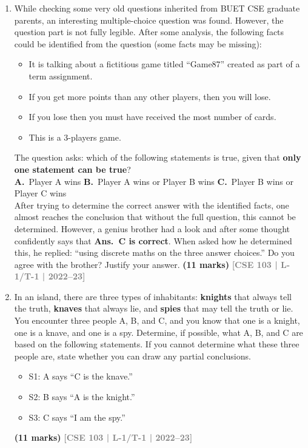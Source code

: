 \documentclass[12pt,a3paper]{article}
\newcommand{\yr}[1]{\hfill\textcolor{gray}{\small\textbf{[#1]}}}
\newcommand{\mk}[1]{\textcolor{orange!70!black}{\small\textbf{(#1 marks)}}}
\begin{document}
\begin{enumerate}
\item While checking some very old questions inherited from BUET CSE graduate parents, an interesting multiple-choice question was found. However, the question part is not fully legible. After some analysis, the following facts could be identified from the question (some facts may be missing):
\begin{itemize}[leftmargin=1.8em,itemsep=2pt,label={$\bullet$}]
  \item It is talking about a fictitious game titled ``Game87'' created as part of a term assignment.
  \item If you get more points than any other players, then you will lose.
  \item If you lose then you must have received the most number of cards.
  \item This is a 3-players game.
\end{itemize}
The question asks: which of the following statements is true, given that \textbf{only one statement can be true}?\\[4pt]
\textbf{A.}\ Player A wins \quad \textbf{B.}\ Player A wins or Player B wins \quad \textbf{C.}\ Player B wins or Player C wins\\[6pt]
After trying to determine the correct answer with the identified facts, one almost reaches the conclusion that without the full question, this cannot be determined. However, a genius brother had a look and after some thought confidently says that \textbf{Ans.\ C is correct}. When asked how he determined this, he replied: ``using discrete maths on the three answer choices.'' Do you agree with the brother? Justify your answer.
\mk{11} \yr{CSE 103 | L-1/T-1 | 2022--23}

\item In an island, there are three types of inhabitants: \textbf{knights} that always tell the truth, \textbf{knaves} that always lie, and \textbf{spies} that may tell the truth or lie. You encounter three people A, B, and C, and you know that one is a knight, one is a knave, and one is a spy. Determine, if possible, what A, B, and C are based on the following statements. If you cannot determine what these three people are, state whether you can draw any partial conclusions.
\begin{itemize}[leftmargin=1.8em,itemsep=2pt,label={$\bullet$}]
  \item S1: A says ``C is the knave.''
  \item S2: B says ``A is the knight.''
  \item S3: C says ``I am the spy.''
\end{itemize}
\mk{11} \yr{CSE 103 | L-1/T-1 | 2022--23}



\end{enumerate}
\end{document}
